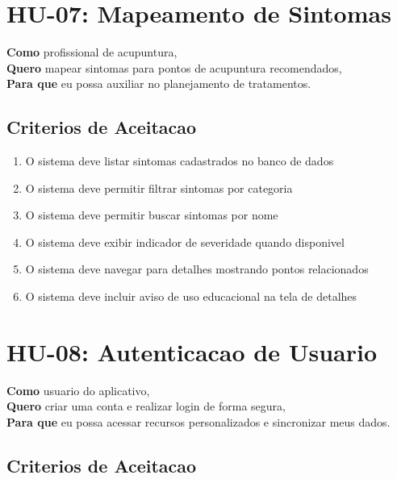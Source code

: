 \begin{apendicesenv}

\section{HU-07: Mapeamento de Sintomas}
\label{hu:mapper}

\textbf{Como} profissional de acupuntura, \\
\textbf{Quero} mapear sintomas para pontos de acupuntura recomendados, \\
\textbf{Para que} eu possa auxiliar no planejamento de tratamentos.

\subsection*{Criterios de Aceitacao}

\begin{enumerate}
    \item O sistema deve listar sintomas cadastrados no banco de dados
    \item O sistema deve permitir filtrar sintomas por categoria
    \item O sistema deve permitir buscar sintomas por nome
    \item O sistema deve exibir indicador de severidade quando disponivel
    \item O sistema deve navegar para detalhes mostrando pontos relacionados
    \item O sistema deve incluir aviso de uso educacional na tela de detalhes
\end{enumerate}

\section{HU-08: Autenticacao de Usuario}
\label{hu:autenticacao}

\textbf{Como} usuario do aplicativo, \\
\textbf{Quero} criar uma conta e realizar login de forma segura, \\
\textbf{Para que} eu possa acessar recursos personalizados e sincronizar meus dados.

\subsection*{Criterios de Aceitacao}


\end{apendicesenv}
